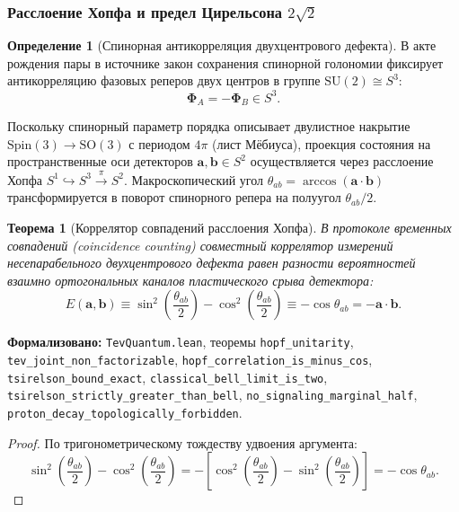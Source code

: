 \documentclass[11pt,a4paper]{article}
\newtheorem{theorem}{Теорема}
\theoremstyle{definition}
\newtheorem{definition}{Определение}
\theoremstyle{remark}
\begin{document}
\subsubsection{Расслоение Хопфа и предел Цирельсона $2\sqrt{2}$}

\begin{definition}[Спинорная антикорреляция двухцентрового дефекта]
В акте рождения пары в источнике закон сохранения спинорной голономии фиксирует антикорреляцию фазовых реперов двух центров в группе $\mathrm{SU}(2) \cong S^3$:
\begin{equation}
\boldsymbol{\Phi}_A = -\boldsymbol{\Phi}_B \in S^3.
\label{eq:spinor_anti_correlation}
\end{equation}
\end{definition}

Поскольку спинорный параметр порядка описывает двулистное накрытие $\mathrm{Spin}(3) \to \mathrm{SO}(3)$ с периодом $4\pi$ (лист Мёбиуса), проекция состояния на пространственные оси детекторов $\mathbf{a}, \mathbf{b} \in S^2$ осуществляется через расслоение Хопфа $S^1 \hookrightarrow S^3 \xrightarrow{\pi} S^2$. Макроскопический угол $\theta_{ab} = \arccos(\mathbf{a} \cdot \mathbf{b})$ трансформируется в поворот спинорного репера на полуугол $\theta_{ab}/2$.

\begin{theorem}[Коррелятор совпадений расслоения Хопфа]
\label{thm:hopf_correlation_exact_proof}
В протоколе временных совпадений (coincidence counting) совместный коррелятор измерений несепарабельного двухцентрового дефекта равен разности вероятностей взаимно ортогональных каналов пластического срыва детектора:
\begin{equation}
E(\mathbf{a}, \mathbf{b}) \equiv \sin^2\left(\frac{\theta_{ab}}{2}\right) - \cos^2\left(\frac{\theta_{ab}}{2}\right) \equiv -\cos\theta_{ab} = -\mathbf{a} \cdot \mathbf{b}.
\label{eq:hopf_correlation_minus_cos}
\end{equation}
\end{theorem}

\noindent\small\textbf{Формализовано:} \texttt{TevQuantum.lean}, теоремы \texttt{hopf_unitarity}, \texttt{tev_joint_non_factorizable}, \texttt{hopf_correlation_is_minus_cos}, \texttt{tsirelson_bound_exact}, \texttt{classical_bell_limit_is_two}, \texttt{tsirelson_strictly_greater_than_bell}, \texttt{no_signaling_marginal_half}, \texttt{proton_decay_topologically_forbidden}.


\begin{proof}
По тригонометрическому тождеству удвоения аргумента:
\begin{equation}
\sin^2\left(\frac{\theta_{ab}}{2}\right) - \cos^2\left(\frac{\theta_{ab}}{2}\right) = -\left[\cos^2\left(\frac{\theta_{ab}}{2}\right) - \sin^2\left(\frac{\theta_{ab}}{2}\right)\right] = -\cos\theta_{ab}.
\end{equation}
\end{proof}
\end{document}
